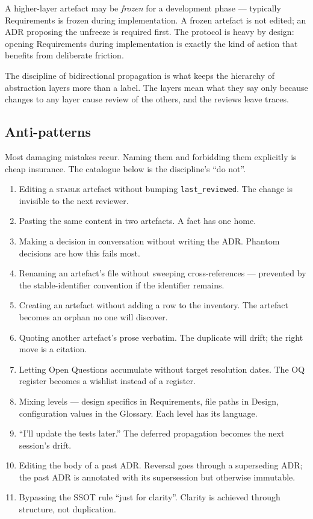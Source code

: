 \documentclass[11pt,a4paper,twocolumn]{article}
\begin{document}
A higher-layer artefact may be \emph{frozen} for a development
phase --- typically Requirements is frozen during implementation. A
frozen artefact is not edited; an ADR proposing the unfreeze is
required first. The protocol is heavy by design: opening
Requirements during implementation is exactly the kind of action
that benefits from deliberate friction.

The discipline of bidirectional propagation is what keeps the
hierarchy of abstraction layers more than a label. The layers
mean what they say only because changes to any layer cause review
of the others, and the reviews leave traces.

\subsection{Anti-patterns}

Most damaging mistakes recur. Naming them and forbidding them
explicitly is cheap insurance. The catalogue below is the
discipline's ``do not''.

\begin{enumerate}[nosep,leftmargin=1.2em]
\item Editing a \textsc{stable} artefact without bumping
  \texttt{last\_reviewed}. The change is invisible to the next
  reviewer.
\item Pasting the same content in two artefacts. A fact has one
  home.
\item Making a decision in conversation without writing the ADR.
  Phantom decisions are how this fails most.
\item Renaming an artefact's file without sweeping cross-references
  --- prevented by the stable-identifier convention if the
  identifier remains.
\item Creating an artefact without adding a row to the inventory.
  The artefact becomes an orphan no one will discover.
\item Quoting another artefact's prose verbatim. The duplicate will
  drift; the right move is a citation.
\item Letting Open Questions accumulate without target resolution
  dates. The OQ register becomes a wishlist instead of a register.
\item Mixing levels --- design specifics in Requirements, file
  paths in Design, configuration values in the Glossary. Each
  level has its language.
\item ``I'll update the tests later.'' The deferred propagation
  becomes the next session's drift.
\item Editing the body of a past ADR. Reversal goes through a
  superseding ADR; the past ADR is annotated with its supersession
  but otherwise immutable.
\item Bypassing the SSOT rule ``just for clarity''. Clarity is
  achieved through structure, not duplication.
\end{enumerate}
\end{document}
